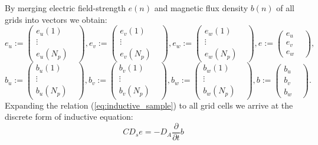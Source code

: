 By merging electric field-strength $e(n)$ and magnetic flux density $b(n)$ of all grids into vectors we obtain:
\begin{equation*}
e_{u}:=
\begin{pmatrix}
e_{u}(1)&\\
\vdots&\\
e_{u}(N_{p})&
\end{pmatrix},
e_{v}:=
\begin{pmatrix}
e_{v}(1)&\\
\vdots&\\
e_{v}(N_{p})&
\end{pmatrix},
e_{w}:=
\begin{pmatrix}
e_{w}(1)&\\
\vdots&\\
e_{w}(N_{p})&
\end{pmatrix},
e:=
\begin{pmatrix}
e_{u}&\\
e_{v}&\\
e_{w}&
\end{pmatrix},
\label{eq:vector_e_field}
\end{equation*}
\begin{equation*}
b_{u}:=
\begin{pmatrix}
b_{u}(1)&\\
\vdots&\\
b_{u}(N_{p})&
\end{pmatrix},
b_{v}:=
\begin{pmatrix}
b_{v}(1)&\\
\vdots&\\
b_{v}(N_{p})&
\end{pmatrix},
b_{w}:=
\begin{pmatrix}
b_{w}(1)&\\
\vdots&\\
b_{w}(N_{p})&
\end{pmatrix},
b:=
\begin{pmatrix}
b_{u}&\\
b_{v}&\\
b_{w}&
\end{pmatrix}.
\label{eq:vector_m_flux_density}
\end{equation*}
Expanding the relation (\ref{eq:inductive_sample}) to all grid cells \cite{FIT_discrete_method,FIT_discrete_electrommagnetism} we arrive at the discrete form of inductive equation:
\begin{equation}
CD_{s}e=-D_{A}\frac{\partial}{\partial{t}}b
\label{eq:inductive_sample_all}
\end{equation}

